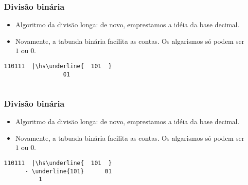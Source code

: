 \documentclass{beamer}
\begin{document}
\begin{frame}[fragile]
\frametitle{Divisão binária}

\begin{itemize}
\item Algoritmo da divisão longa: de novo, emprestamos a idéia da base decimal.

\item Novamente, a tabuada binária facilita as contas. Os algarismos só podem ser $1$ ou $0$.
\end{itemize}

\def\hs{\hspace{-1mm}}

\begin{Verbatim}[commandchars=\\\{\},codes={\catcode`$=3\catcode`^=7}]
        110111  |\hs\underline{  101  }
                 01
            
\end{Verbatim}

\end{frame}


\begin{frame}[fragile]
\frametitle{Divisão binária}

\begin{itemize}
\item Algoritmo da divisão longa: de novo, emprestamos a idéia da base decimal.

\item Novamente, a tabuada binária facilita as contas. Os algarismos só podem ser $1$ ou $0$.
\end{itemize}

\def\hs{\hspace{-1mm}}

\begin{Verbatim}[commandchars=\\\{\},codes={\catcode`$=3\catcode`^=7}]
        110111  |\hs\underline{  101  }
      - \underline{101}      01
          1  
\end{Verbatim}

\end{frame}

\end{document}
